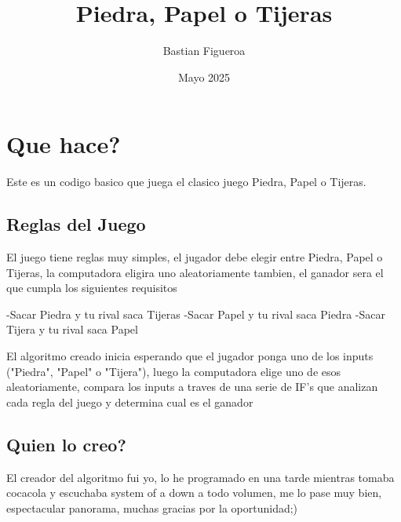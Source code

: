 \documentclass{article}
\title{Piedra, Papel o Tijeras}
\author{Bastian Figueroa }
\date{Mayo 2025}
\begin{document}
\maketitle

\section{Que hace?}
Este es un codigo basico que juega el clasico juego Piedra, Papel o Tijeras.


\subsection{Reglas del Juego}
El juego tiene reglas muy simples, el jugador debe elegir entre Piedra, Papel o Tijeras, la computadora eligira uno aleatoriamente tambien, el ganador sera el que cumpla los siguientes requisitos 
\newline
\begin{center}

-Sacar Piedra y tu rival saca Tijeras
\newline
  -Sacar Papel y tu rival saca Piedra
\newline
-Sacar Tijera y tu rival saca Papel
\newline
\end{center}
El algoritmo creado inicia esperando que el jugador ponga uno de los inputs ("Piedra", "Papel" o "Tijera"), luego la computadora elige uno de esos aleatoriamente, compara los inputs a traves de una serie de IF's que analizan cada regla del juego y determina cual es el ganador
\subsection{Quien lo creo?}
El creador del algoritmo fui yo, lo he programado en una tarde mientras tomaba cocacola y escuchaba system of a down a todo volumen, me lo pase muy bien, espectacular panorama, muchas gracias por la oportunidad;)
\end{document}
